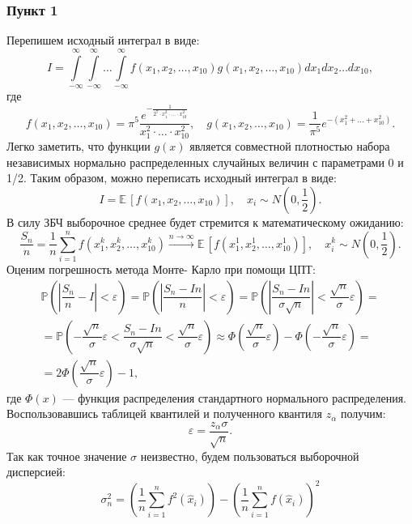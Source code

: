 \documentclass[oneside, final, 12pt]{article}
\def\E{{\mathbb{E} }\,}
\def\P{{\mathbb{P} }}
\begin{document}
\subsubsection{Пункт 1}
	Перепишем исходный интеграл в виде:
	$$
		I = \int\limits_{-\infty}^{\infty} \int\limits_{-\infty}^{\infty}
                \ldots \int\limits_{-\infty}^{\infty}
            f(x_1, x_2, \ldots, x_{10}) g(x_1, x_2, \ldots, x_{10}) 
            d x_1 d x_2 \ldots d x_{10},
	$$
	где 
	$$
		f(x_1, x_2, \ldots, x_{10}) = \pi^5  \frac{e^{-\frac{1}{2^7\cdot x_1^2 \cdot \ldots \cdot x_{10}^2 }}}
                    {x_1^2 \cdot \ldots \cdot x_{10}^2}, \quad
		g(x_1, x_2, \ldots, x_{10})= \dfrac{1}{\pi^5} e^{-\left(x_1^2+\ldots+ x_{10}^2\right)}.
	$$
	Легко заметить, что функции $g(x)$ является совместной плотностью набора независимых нормально 
	распределенных случайных величин с параметрами 0 и 1/2. Таким образом, можно переписать 
	исходный интеграл в виде:
	$$
		I =\E [f(x_1, x_2, \ldots, x_{10})], \quad x_i \sim N\left(0,\frac{1}{2}\right).
	$$ 
	В силу ЗБЧ выборочное среднее будет стремится к математическому ожиданию:
	$$
		\dfrac{S_n}{n} = \dfrac{1}{n}\sum\limits_{i=1}^{n}f(x_1^k, x_2^k, \ldots, x^k_{10})
			 \xrightarrow[]{n\rightarrow \infty} \E [f(x^1_1, x^1_2, \ldots, x^1_{10})], 
				\quad x^k_i \sim N\left(0,\frac{1}{2}\right).
	$$
	Оценим погрешность метода Монте- Карло при помощи ЦПТ:
	$$
		\begin{gathered}
			\P \left( \left| \dfrac{S_n}{n}-I \right| < \varepsilon \right) = 
			\P \left( \left| \dfrac{S_n-In}{n} \right| < \varepsilon \right) =
			\P \left( \left| \dfrac{S_n-In}{\sigma \sqrt{n}} \right| < \dfrac{\sqrt{n}}{\sigma}\varepsilon \right) =\\= 
			\P \left(  - \dfrac{\sqrt{n}}{\sigma}\varepsilon  <
							 \dfrac{S_n-In}{\sigma \sqrt{n}} 
								< \dfrac{\sqrt{n}}{\sigma}\varepsilon \right) \approx
			\Phi\left(\dfrac{\sqrt{n}}{\sigma}\varepsilon\right) - \Phi\left(-\dfrac{\sqrt{n}}{\sigma}\varepsilon\right)=\\ = 
			2 \Phi\left(\dfrac{\sqrt{n}}{\sigma}\varepsilon\right)-1,
		\end{gathered}	
	$$
	где $\Phi(x)$ --- функция распределения стандартного нормального распределения. \newline
	Воспользовавшись таблицей квантилей и полученного квантиля $z_{\alpha}$ получим: 
	$$
		\varepsilon = \dfrac{z_{\alpha}\sigma}{\sqrt{n}}.
	$$
	Так как точное значение $\sigma$ неизвестно, будем пользоваться выборочной дисперсией:
	$$
		\sigma^2_n = \left( \dfrac{1}{n} \sum\limits_{i=1}^{n} f^2(\hat{x}_i) \right) - 
							   \left( \dfrac{1}{n} \sum\limits_{i=1}^{n} f(\hat{x}_i) \right)^2
	$$
	
\end{document}

